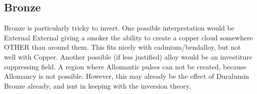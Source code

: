 \documentclass[conference]{IEEEtran}
\begin{document}
\subsection*{Bronze}
Bronze is particularly tricky to invert.  One possible interpretation would be External External giving a smoker the ability to create a copper cloud somewhere OTHER than around them.  This fits nicely with cadmium/bendalloy, but not well with Copper.
Another possible (if less justified) alloy would be an investiture suppressing field.  A region where Allomantic pulses can not be created, because Allomancy is not possible.  However, this may already be the effect of Duralumin Bronze already, and isnt in keeping with the inversion theory.
\end{document}
